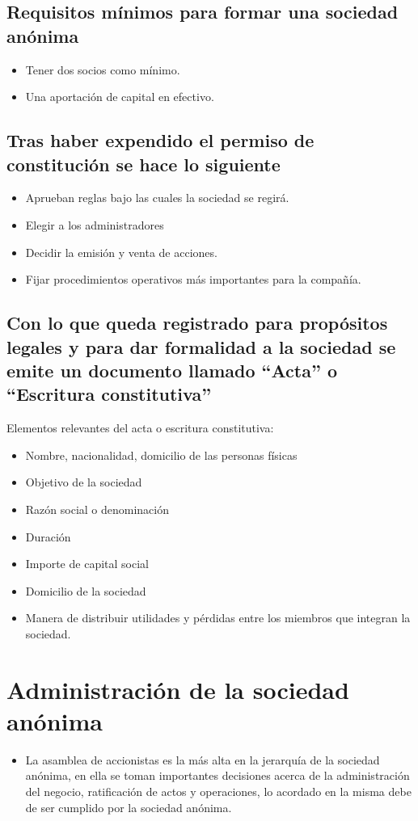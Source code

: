 \documentclass{article}
\begin{document}
\subsection{Requisitos mínimos para formar una sociedad anónima}
\begin{itemize}
    \item Tener dos socios como mínimo.
    \item Una aportación de capital en efectivo.
\end{itemize}


\subsection{Tras haber expendido el permiso de constitución se hace lo siguiente}
\begin{itemize}
    \item Aprueban reglas bajo las cuales la sociedad se regirá.
    \item Elegir a los administradores
    \item Decidir la emisión y venta de acciones.
    \item Fijar procedimientos operativos más importantes para la compañía. 
\end{itemize}


\subsection{Con lo que queda registrado para propósitos legales y para dar formalidad a la sociedad se emite un documento llamado ``Acta'' o ``Escritura constitutiva''}
Elementos relevantes del acta o escritura constitutiva:
\begin{itemize}
    \item Nombre, nacionalidad, domicilio de las personas físicas
    \item Objetivo de la sociedad
    \item Razón social o denominación
    \item Duración
    \item Importe de capital social
    \item Domicilio de la sociedad
    \item Manera de distribuir utilidades y pérdidas entre los miembros que integran la sociedad.
\end{itemize}


\section{Administración de la sociedad anónima}
\begin{itemize}
    \item La asamblea de accionistas es la más alta en la jerarquía de la sociedad anónima, en ella se toman importantes decisiones acerca de la administración del negocio, ratificación de actos y operaciones, lo acordado en la misma debe de ser cumplido por la sociedad anónima.
\end{itemize}
\end{document}
